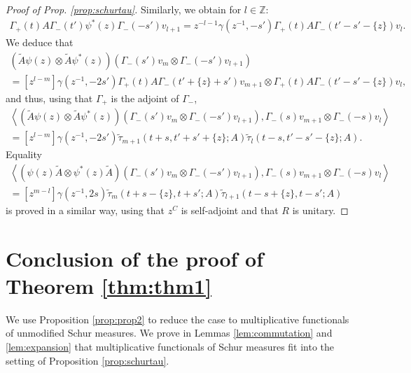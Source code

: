 \documentclass[12pt]{amsart}
\theoremstyle{definition}
\newcommand{\Z}{\mathbb{Z}}
\begin{document}
\begin{proof}[Proof of Prop. \ref{prop:schurtau}]
Similarly, we obtain for $l \in \Z$:
\begin{align*}
\Gamma_+(t)A\Gamma_-(t')  \psi^*(z) \Gamma_-(-s') v_{l+1} =  z^{-l-1} \gamma ( z^{-1} , -s') \Gamma_+(t)A \Gamma_-(t' -s' - \{ z \}) v_l.
\end{align*}
We deduce that
\begin{multline*}
[z^0]\left( \tilde{A} \psi(z) \otimes \tilde{A} \psi^*(z) \right) \left( \Gamma_-(s') v_m \otimes \Gamma_-(-s') v_{l+1} \right) \\
= [z^{l-m}] \gamma( z^{-1} , -2s' ) \Gamma_+(t) A \Gamma_-(t'  + \{z\} + s' )v_{m+1} \otimes \Gamma_+(t)A \Gamma_-(t' -s' - \{ z \}) v_l,
\end{multline*}
and thus, using that $\Gamma_+$ is the adjoint of $\Gamma_-$,
\begin{multline*}
[z^0] \left\langle \left( \tilde{A} \psi(z) \otimes \tilde{A} \psi^*(z) \right) \left( \Gamma_-(s') v_m \otimes \Gamma_-(-s') v_{l+1} \right) , \Gamma_-(s) v_{m+1} \otimes \Gamma_-(-s) v_{l} \right\rangle \\
=  [z^{l-m}]  \gamma(z^{-1},-2s')\tilde{\tau}_{m+1}(t+s,t'+s'+\{z\};A) \tilde{\tau}_l(t-s,t'-s'-\{z\} ; A ) .
\end{multline*}
Equality
\begin{multline}
[z^0] \left\langle \left( \psi(z) \tilde{A} \otimes \psi^*(z) \tilde{A}\right) \left( \Gamma_-(s') v_m \otimes \Gamma_-(-s') v_{l+1} \right) , \Gamma_-(s) v_{m+1} \otimes \Gamma_-(-s) v_{l} \right\rangle \\
= [z^{m-l}] \gamma(z^{-1},2s) \tilde{\tau}_m (t+s -\{z\} , t +s' ; A) \tilde{\tau}_{l+1}(t-s+ \{z \}, t-s'; A )
\end{multline}
is proved in a similar way, using that $z^C$ is self-adjoint and that $R$ is unitary.
\end{proof}

\section{Conclusion of the proof of Theorem \ref{thm:thm1}} \label{section:proof}

We use Proposition \ref{prop:prop2} to reduce the case to multiplicative functionals of unmodified Schur measures. We prove in Lemmas \ref{lem:commutation} and \ref{lem:expansion} that multiplicative functionals of Schur measures fit into the setting of Proposition \ref{prop:schurtau}.\\
\end{document}

